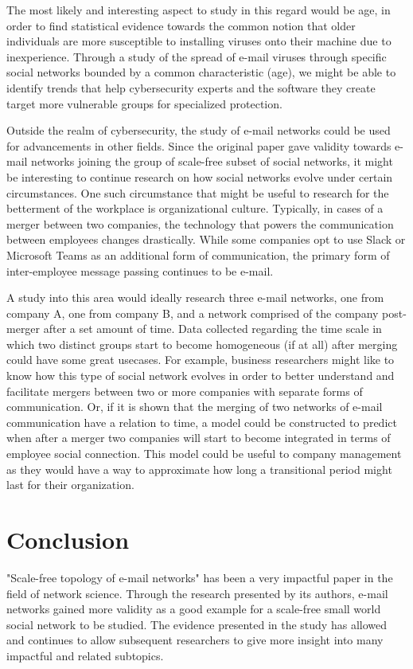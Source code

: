 \documentclass[11pt]{article}
\begin{document}
\begin{multicols}{2}
The most likely and interesting aspect to study in this regard would be age, in order to find statistical evidence towards the common notion that older individuals are more susceptible to installing viruses onto their machine due to inexperience. Through a study of the spread of e-mail viruses through specific social networks bounded by a common characteristic (age), we might be able to identify trends that help cybersecurity experts and the software they create target more vulnerable groups for specialized protection.

Outside the realm of cybersecurity, the study of e-mail networks could be used for advancements in other fields. Since the original paper gave validity towards e-mail networks joining the group of scale-free subset of social networks, it might be interesting to continue research on how social networks evolve under certain circumstances. One such circumstance that might be useful to research for the betterment of the workplace is organizational culture. Typically, in cases of a merger between two companies, the technology that powers the communication between employees changes drastically. While some companies opt to use Slack or Microsoft Teams as an additional form of communication, the primary form of inter-employee message passing continues to be e-mail. 

A study into this area would ideally research three e-mail networks, one from company A, one from company B, and a network comprised of the company post-merger after a set amount of time. Data collected regarding the time scale in which two distinct groups start to become homogeneous (if at all) after merging could have some great usecases. For example, business researchers might like to know how this type of social network evolves in order to better understand and facilitate mergers between two or more companies with separate forms of communication. Or, if it is shown that the merging of two networks of e-mail communication have a relation to time, a model could be constructed to predict when after a merger two companies will start to become integrated in terms of employee social connection. This model could be useful to company management as they would have a way to approximate how long a transitional period might last for their organization.

\section{Conclusion}
\hspace*{\parindent}"Scale-free topology of e-mail networks" has been a very impactful paper in the field of network science. Through the research presented by its authors, e-mail networks gained more validity as a good example for a scale-free small world social network to be studied. The evidence presented in the study has allowed and continues to allow subsequent researchers to give more insight into many impactful and related subtopics. 


\end{multicols}
\end{document}
